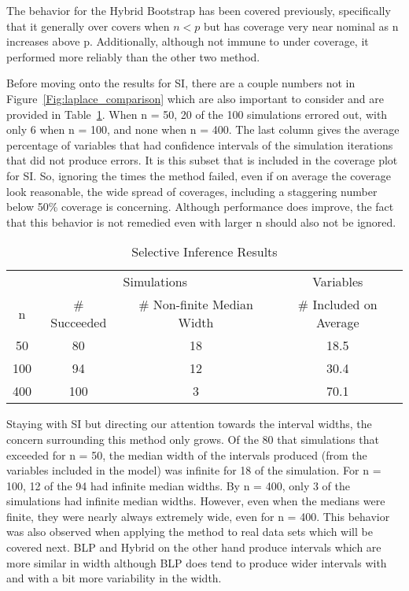 The behavior for the Hybrid Bootstrap has been covered previously, specifically that it generally over covers when $n < p$ but has coverage very near nominal as n increases above p. Additionally, although not immune to under coverage, it performed more reliably than the other two method.

Before moving onto the results for SI, there are a couple numbers not in Figure~\ref{Fig:laplace_comparison} which are also important to consider and are provided in Table~\ref{Tab:selective_inference}. When n = 50, 20 of the 100 simulations errored out, with only 6 when n = 100, and none when n = 400. The last column gives the average percentage of variables that had confidence intervals of the simulation iterations that did not produce errors. It is this subset that is included in the coverage plot for SI. So, ignoring the times the method failed, even if on average the coverage look reasonable, the wide spread of coverages, including a staggering number below 50\% coverage is concerning. Although performance does improve, the fact that this behavior is not remedied even with larger n should also not be ignored.

\begin{table}[hb]
  \centering
  \begin{tabular}{cccc}
  \hline
  & \multicolumn{2}{c}{Simulations} & Variables \\
  n & \# Succeeded & \# Non-finite Median Width & \# Included on Average \\
  \hline
  50  & 80 & 18 & 18.5 \\
  100 & 94 & 12 & 30.4 \\
  400 & 100 & 3 & 70.1 \\
  \hline
  \end{tabular}
  \caption{Selective Inference Results}
  \label{Tab:selective_inference}
\end{table}

Staying with SI but directing our attention towards the interval widths, the concern surrounding this method only grows. Of the 80 that simulations that exceeded for n = 50, the median width of the intervals produced (from the variables included in the model) was infinite for 18 of the simulation. For n = 100, 12 of the 94 had infinite median widths. By n = 400, only 3 of the simulations had infinite median widths. However, even when the medians were finite, they were nearly always extremely wide, even for n = 400. This behavior was also observed when applying the method to real data sets which will be covered next. BLP and Hybrid on the other hand produce intervals which are more similar in width although BLP does tend to produce wider intervals with and with a bit more variability in the width.

